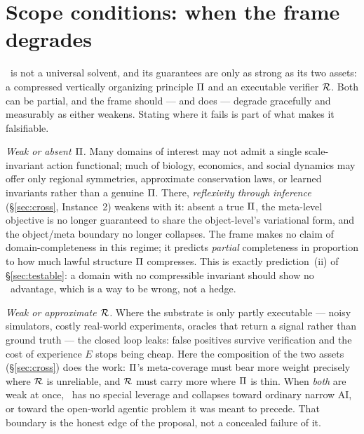 \section{Scope conditions: when the frame degrades}
\label{sec:scope}

\DCI\ is not a universal solvent, and its guarantees are only as strong as its two assets: a compressed vertically organizing principle $\Pi$ and an executable verifier $\mathcal{R}$. Both can be partial, and the frame should --- and does --- degrade gracefully and measurably as either weakens. Stating where it fails is part of what makes it falsifiable.

\emph{Weak or absent $\Pi$.} Many domains of interest may not admit a single scale-invariant action functional; much of biology, economics, and social dynamics may offer only regional symmetries, approximate conservation laws, or learned invariants rather than a genuine $\Pi$. There, \emph{reflexivity through inference} (\S\ref{sec:cross}, Instance~2) weakens with it: absent a true $\Pi$, the meta-level objective is no longer guaranteed to share the object-level's variational form, and the object/meta boundary no longer collapses. The frame makes no claim of domain-completeness in this regime; it predicts \emph{partial} completeness in proportion to how much lawful structure $\Pi$ compresses. This is exactly prediction~(ii) of \S\ref{sec:testable}: a domain with no compressible invariant should show no \DCI\ advantage, which is a way to be wrong, not a hedge.

\emph{Weak or approximate $\mathcal{R}$.} Where the substrate is only partly executable --- noisy simulators, costly real-world experiments, oracles that return a signal rather than ground truth --- the closed loop leaks: false positives survive verification and the cost of experience $E$ stops being cheap. Here the composition of the two assets (\S\ref{sec:cross}) does the work: $\Pi$'s meta-coverage must bear more weight precisely where $\mathcal{R}$ is unreliable, and $\mathcal{R}$ must carry more where $\Pi$ is thin. When \emph{both} are weak at once, \DCI\ has no special leverage and collapses toward ordinary narrow AI, or toward the open-world agentic problem it was meant to precede. That boundary is the honest edge of the proposal, not a concealed failure of it.

